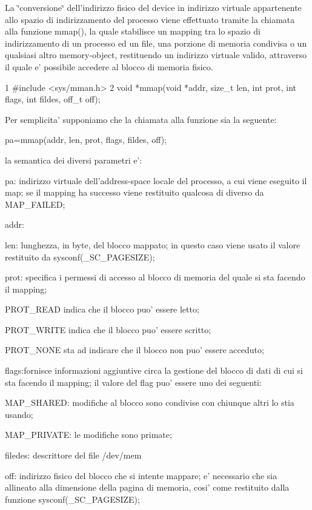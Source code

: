 La \char`\"{}conversione\char`\"{} dell'indirizzo fisico del device in indirizzo virtuale appartenente allo spazio di indirizzamento del processo viene effettuato tramite la chiamata alla funzione mmap(), la quale stabilisce un mapping tra lo spazio di indirizzamento di un processo ed un file, una porzione di memoria condivisa o un qualsiasi altro memory-\/object, restituendo un indirizzo virtuale valido, attraverso il quale e' possibile accedere al blocco di memoria fisico. 
\begin{DoxyCode}
1 #include <sys/mman.h>
2 void *mmap(void *addr, size\_t len, int prot, int flags, int fildes, off\_t off);
\end{DoxyCode}
 Per semplicita' supponiamo che la chiamata alla funzione sia la seguente\+: \begin{center}pa=mmap(addr, len, prot, flags, fildes, off);\end{center}  la semantica dei diversi parametri e'\+:
\begin{DoxyItemize}
\item pa\+: indirizzo virtuale dell'address-\/space locale del processo, a cui viene eseguito il map; se il mapping ha successo viene restituito qualcosa di diverso da M\+A\+P\+\_\+\+F\+A\+I\+L\+E\+D;
\item addr\+:
\item len\+: lunghezza, in byte, del blocco mappato; in questo caso viene usato il valore restituito da sysconf(\+\_\+\+S\+C\+\_\+\+P\+A\+G\+E\+S\+I\+Z\+E);
\item prot\+: specifica i permessi di accesso al blocco di memoria del quale si sta facendo il mapping;
\begin{DoxyItemize}
\item P\+R\+O\+T\+\_\+\+R\+E\+A\+D indica che il blocco puo' essere letto;
\item P\+R\+O\+T\+\_\+\+W\+R\+I\+T\+E indica che il blocco puo' essere scritto;
\item P\+R\+O\+T\+\_\+\+N\+O\+N\+E sta ad indicare che il blocco non puo' essere acceduto;
\end{DoxyItemize}
\item flags\+:fornisce informazioni aggiuntive circa la gestione del blocco di dati di cui si sta facendo il mapping; il valore del flag puo' essere uno dei seguenti\+:
\begin{DoxyItemize}
\item M\+A\+P\+\_\+\+S\+H\+A\+R\+E\+D\+: modifiche al blocco sono condivise con chiunque altri lo stia usando;
\item M\+A\+P\+\_\+\+P\+R\+I\+V\+A\+T\+E\+: le modifiche sono primate;
\end{DoxyItemize}
\end{DoxyItemize}
\begin{DoxyItemize}
\item filedes\+: descrittore del file /dev/mem
\item off\+: indirizzo fisico del blocco che si intente mappare; e' necessario che sia allineato alla dimensione della pagina di memoria, cosi' come restituito dalla funzione sysconf(\+\_\+\+S\+C\+\_\+\+P\+A\+G\+E\+S\+I\+Z\+E);
\end{DoxyItemize}

